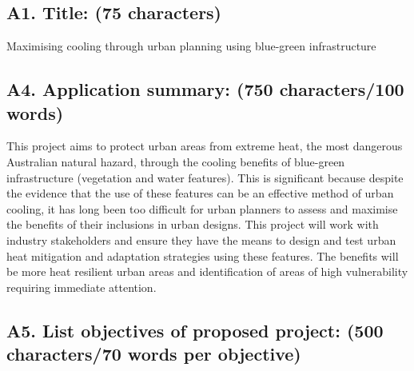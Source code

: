 \subsection*{\TitleFont A1. Title: (75 characters) }


Maximising cooling through urban planning using blue-green infrastructure 



\subsection*{\TitleFont A4. Application summary: (750 characters/100 words) }






This project aims to protect urban areas from extreme heat, the most dangerous Australian natural hazard, through the cooling benefits of blue-green infrastructure (vegetation and water features). This is significant because despite the evidence that the use of these features can be an effective method of urban cooling, it has long been too difficult for urban planners to assess and maximise the benefits of their inclusions in urban designs. This project will work with industry stakeholders and ensure they have the means to design and test urban heat mitigation and adaptation strategies using these features. The benefits will be more heat resilient urban areas and identification of areas of high vulnerability requiring immediate attention.




\subsection*{\TitleFont A5. List objectives of proposed project: (500 characters/70 words per objective) }





